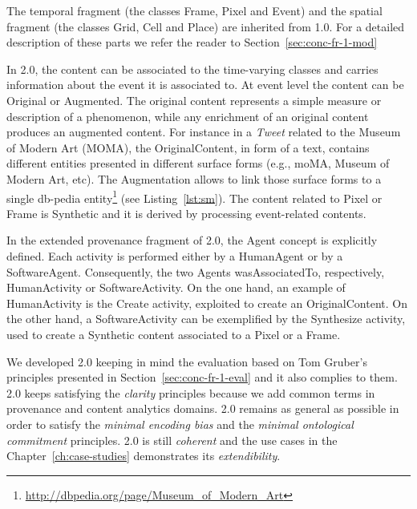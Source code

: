 The temporal fragment (the classes \textsf{Frame}, \textsf{Pixel} and \textsf{Event}) and the spatial fragment (the classes \textsf{Grid}, \textsf{Cell} and \textsf{Place}) are inherited from \frappe{} 1.0.
For a detailed description of these parts we refer the reader to Section~\ref{sec:conc-fr-1-mod}

In \frappe{} 2.0, the content can be associated to the time-varying classes and carries information about the event it is associated to.
At event level the content can be \textsf{Original} or \textsf{Augmented}. The original content represents a simple measure or description of a phenomenon, while any enrichment of an original content produces an augmented content.
For instance in a \textit{Tweet} related to the Museum of Modern Art (MOMA),  the \textsf{OriginalContent}, in form of a text, contains different entities presented in different surface forms (e.g., moMA, Museum of Modern Art, etc). The \textsf{Augmentation} allows to link those surface forms to a single db-pedia entity\footnote{\url{http://dbpedia.org/page/Museum_of_Modern_Art}} (see Listing~\ref{lst:sm}).
The content related to \textsf{Pixel} or \textsf{Frame} is \textsf{Synthetic} and it is derived by processing event-related contents. 

In the extended provenance fragment of \frappe{} 2.0, the \textsf{Agent} concept is explicitly defined.
Each activity is performed either by a \textsf{HumanAgent} or by a \textsf{SoftwareAgent}. Consequently, the two \textsf{Agent}s \textsf{wasAssociatedTo}, respectively, \textsf{HumanActivity} or \textsf{SoftwareActivity}. 
On the one hand, an example of \textsf{HumanActivity} is the \textsf{Create} activity, exploited to create an \textsf{OriginalContent}. On the other hand, a \textsf{SoftwareActivity} can be exemplified by the \textsf{Synthesize} activity, used to create a \textsf{Synthetic} content associated to a \textsf{Pixel} or a \textsf{Frame}.

We developed \frappe{} 2.0 keeping in mind the evaluation based on Tom Gruber's principles presented in Section~\ref{sec:conc-fr-1-eval} and it also complies to them.
\frappe{} 2.0 keeps satisfying the \textit{clarity} principles because we add common terms in provenance and content analytics domains. \frappe{} 2.0 remains as general as possible in order to satisfy the \textit{minimal encoding bias} and the \textit{minimal ontological commitment} principles. \frappe{} 2.0 is still \textit{coherent} and the use cases in the Chapter~\ref{ch:case-studies} demonstrates its \textit{extendibility}.

